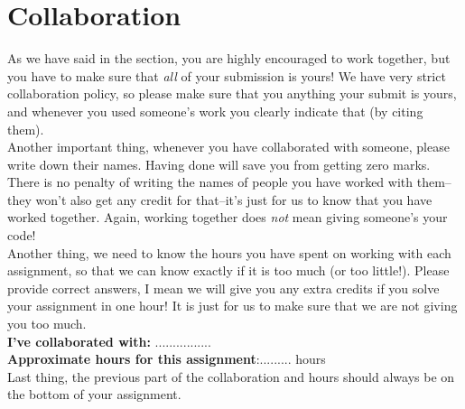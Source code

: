 \documentclass[paper=a4, fontsize=11pt]{scrartcl} %
\numberwithin{equation}{section} %
\numberwithin{figure}{section} %
\numberwithin{table}{section} %
\begin{document}
\section{Collaboration}
As we have said in the section, you are highly encouraged to work together, but you have to make sure that \textit{all} of your submission is yours! We have very strict collaboration policy, so please make sure that you anything your submit is yours, and whenever you used someone's work you clearly indicate that (by citing them).\\
Another important thing, whenever you have collaborated with someone, please write down their names. Having done will save you from getting zero marks. There is no penalty of writing the names of people you have worked with them--they won't also get any credit for that--it's just for us to know that you have worked together. Again, working together does \textit{not} mean giving someone's your code!\\
Another thing, we need to know the hours you have spent on working with each assignment, so that we can know exactly if it is too much (or too little!). Please provide correct answers, I mean we will give you any extra credits if you solve your assignment in one hour! It is just for us to make sure that we are not giving you too much.
\\

\textbf{I've collaborated with:} ................\\
\textbf{Approximate hours for this assignment}:......... hours
\\

Last thing, the previous part of the collaboration and hours should always be on the bottom of your assignment.\\


 
\end{document}
